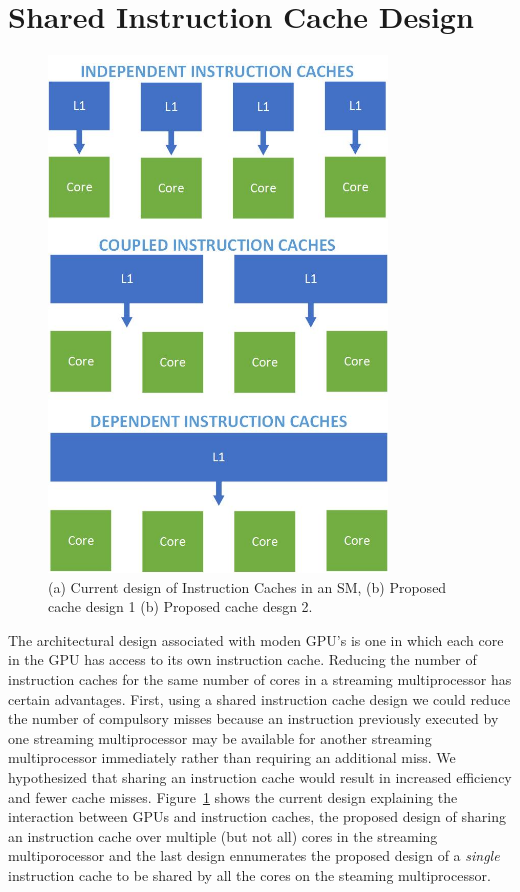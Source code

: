 \section{Shared Instruction Cache Design}

\begin{figure}[ht!]
\centering
\includegraphics[width=90mm]{InstructionCacheDesignSketches.jpg}
\caption{(a) Current design of Instruction Caches in an SM, (b) Proposed cache design 1 (b) Proposed cache desgn 2.}
\label{propDesign}
\end{figure}

The architectural design associated with moden GPU's is one in which
each core in the GPU has access to its own instruction cache. 
Reducing the number of instruction caches for the same number of cores
in a streaming multiprocessor has certain advantages. 
First, using a shared instruction cache design we could reduce the
number of compulsory misses because an instruction previously executed
by one streaming multiprocessor may be available for another streaming
multiprocessor immediately rather than requiring an additional miss. 
We hypothesized that sharing an instruction cache would result in
increased efficiency and fewer cache misses. 
Figure~\ref{propDesign} shows the current design explaining the
interaction between GPUs and instruction caches, the proposed design
of sharing an instruction cache over multiple (but not all) cores in
the streaming multiporocessor and the last design ennumerates the
proposed design of a \emph{single} instruction cache to be shared by
all the cores on the steaming multiprocessor.
 




